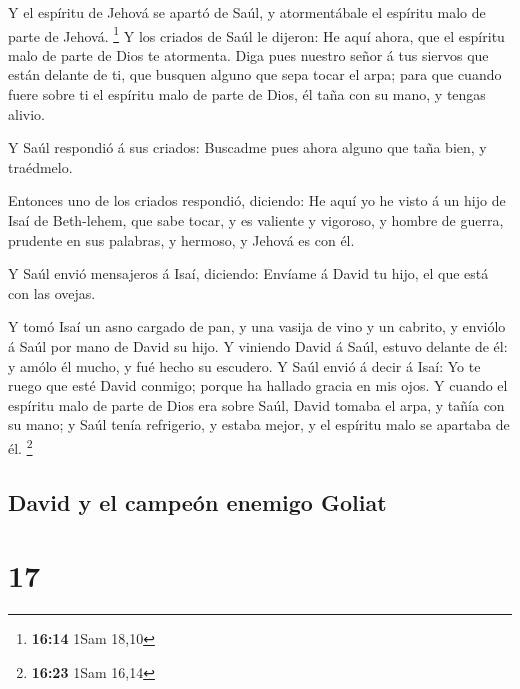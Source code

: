 Y el espíritu de Jehová se apartó de Saúl, y
atormentábale el espíritu malo de parte de Jehová. \footnote{\textbf{16:14}
  1Sam 18,10}  Y los criados de Saúl le dijeron: He aquí
ahora, que el espíritu malo de parte de Dios te atormenta.
 Diga pues nuestro señor á tus siervos que están delante
de ti, que busquen alguno que sepa tocar el arpa; para que cuando fuere
sobre ti el espíritu malo de parte de Dios, él taña con su mano, y
tengas alivio.

 Y Saúl respondió á sus criados: Buscadme pues ahora
alguno que taña bien, y traédmelo.

 Entonces uno de los criados respondió, diciendo: He aquí
yo he visto á un hijo de Isaí de Beth-lehem, que sabe tocar, y es
valiente y vigoroso, y hombre de guerra, prudente en sus palabras, y
hermoso, y Jehová es con él.

 Y Saúl envió mensajeros á Isaí, diciendo: Envíame á
David tu hijo, el que está con las ovejas.

 Y tomó Isaí un asno cargado de pan, y una vasija de vino
y un cabrito, y enviólo á Saúl por mano de David su hijo.
 Y viniendo David á Saúl, estuvo delante de él: y amólo
él mucho, y fué hecho su escudero.  Y Saúl envió á decir
á Isaí: Yo te ruego que esté David conmigo; porque ha hallado gracia en
mis ojos.  Y cuando el espíritu malo de parte de Dios era
sobre Saúl, David tomaba el arpa, y tañía con su mano; y Saúl tenía
refrigerio, y estaba mejor, y el espíritu malo se apartaba de él.
\footnote{\textbf{16:23} 1Sam 16,14}

\hypertarget{david-y-el-campeuxf3n-enemigo-goliat}{%
\subsection{David y el campeón enemigo
Goliat}\label{david-y-el-campeuxf3n-enemigo-goliat}}

\hypertarget{section-16}{%
\section{17}\label{section-16}}

